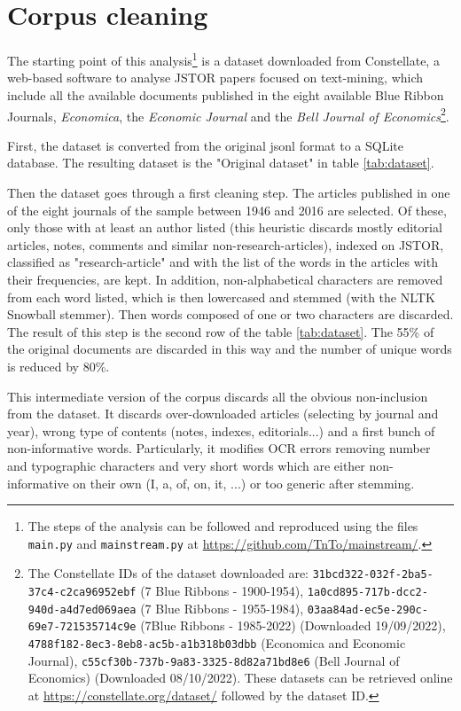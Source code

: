 \documentclass[a4paper, 11pt, headings=standardclasses, tablecaptionsbelow]{scrartcl}
\begin{document}
\section{Corpus cleaning}
The starting point of this analysis\footnote{The steps of the analysis can be followed and reproduced using the files \texttt{main.py} and \texttt{mainstream.py} at \url{https://github.com/TnTo/mainstream/}.} is a dataset downloaded from Constellate, a web-based software to analyse JSTOR papers focused on text-mining, which include all the available documents published in the eight available Blue Ribbon Journals, \textit{Economica}, the \textit{Economic Journal} and the \textit{Bell Journal of Economics}\footnote{The Constellate IDs of the dataset downloaded are: \texttt{31bcd322-032f-2ba5-37c4-c2ca96952ebf} (7 Blue Ribbons - 1900-1954), \texttt{1a0cd895-717b-dcc2-940d-a4d7ed069aea} (7 Blue Ribbons - 1955-1984), \texttt{03aa84ad-ec5e-290c-69e7-721535714c9e} (7Blue Ribbons - 1985-2022) (Downloaded 19/09/2022), \texttt{4788f182-8ec3-8eb8-ac5b-a1b318b03dbb} (Economica and Economic Journal), \texttt{c55cf30b-737b-9a83-3325-8d82a71bd8e6} (Bell Journal of Economics) (Downloaded 08/10/2022). These datasets can be retrieved online at \url{https://constellate.org/dataset/} followed by the dataset ID.}.



First, the dataset is converted from the original jsonl format to a SQLite database. The resulting dataset is the "Original dataset" in table \ref*{tab:dataset}.

Then the dataset goes through a first cleaning step. The articles published in one of the eight journals of the sample between 1946 and 2016 are selected. Of these, only those with at least an author listed (this heuristic discards mostly editorial articles, notes, comments and similar non-research-articles), indexed on JSTOR, classified as "research-article" and with the list of the words in the articles with their frequencies, are kept. In addition, non-alphabetical characters are removed from each word listed, which is then lowercased and stemmed (with the NLTK Snowball stemmer). Then words composed of one or two characters are discarded.
The result of this step is the second row of the table \ref{tab:dataset}.
The 55\% of the original documents are discarded in this way and the number of unique words is reduced by 80\%.

This intermediate version of the corpus discards all the obvious non-inclusion from the dataset. It discards over-downloaded articles (selecting by journal and year), wrong type of contents (notes, indexes, editorials...) and a first bunch of non-informative words. Particularly, it modifies OCR errors removing number and typographic characters and very short words which are either non-informative on their own (I, a, of, on, it, ...) or too generic after stemming.
\end{document}
